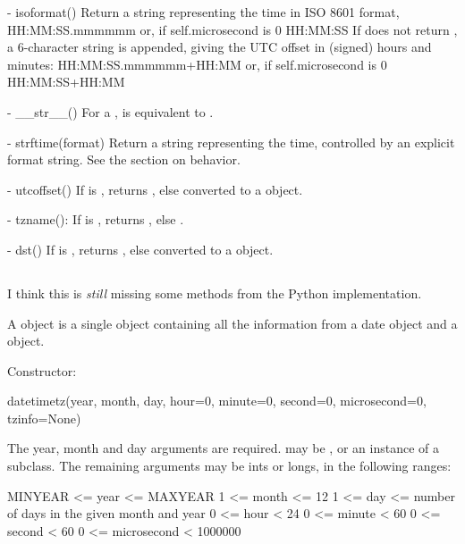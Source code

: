   - isoformat()
    Return a string representing the time in ISO 8601 format,
        HH:MM:SS.mmmmmm
    or, if self.microsecond is 0
        HH:MM:SS
    If  does not return , a 6-character
    string is appended, giving the UTC offset in (signed) hours and
    minutes:
        HH:MM:SS.mmmmmm+HH:MM
    or, if self.microsecond is 0
        HH:MM:SS+HH:MM

  - __str__()
    For a  ,  is equivalent to
    .

  - strftime(format)
    Return a string representing the time, controlled by an explicit
    format string.  See the section on  behavior.

  - utcoffset()
    If  is , returns , else
     converted to a 
    object.

  - tzname():
    If  is , returns , else
    .

  - dst()
    If  is , returns , else
     converted to a  object.



\subsection{   \label{datetime-datetimetz}}

\begin{notice}[warning]
  I think this is \emph{still} missing some methods from the
  Python implementation.
\end{notice}

A  object is a single object containing all the information
from a date object and a  object.

Constructor:

    datetimetz(year, month, day,
               hour=0, minute=0, second=0, microsecond=0, tzinfo=None)

    The year, month and day arguments are required.   may
    be , or an instance of a  subclass.  The
    remaining arguments may be ints or longs, in the following ranges:

        MINYEAR <= year <= MAXYEAR
        1 <= month <= 12
        1 <= day <= number of days in the given month and year
        0 <= hour < 24
        0 <= minute < 60
        0 <= second < 60
        0 <= microsecond < 1000000


